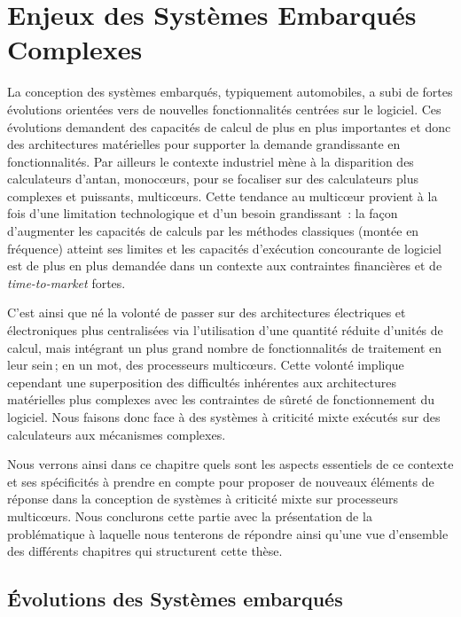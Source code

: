 \documentclass[french, a4paper, 11pt, twoside, pdftex]{StyleThese}
\begin{document}
\setcounter{chapter}{1}
\dominitoc
\faketableofcontents
\fi

\chapter{Enjeux des Systèmes Embarqués Complexes} \label{chap:1_EnjeuxIntro}
\minitoc

La conception des systèmes embarqués, typiquement automobiles, a subi de fortes évolutions orientées vers de nouvelles fonctionnalités centrées sur le logiciel.
Ces évolutions demandent des capacités de calcul de plus en plus importantes et donc des architectures matérielles pour supporter la demande grandissante en fonctionnalités.
Par ailleurs le contexte industriel mène à la disparition des calculateurs d'antan, monocœurs, pour se focaliser sur des calculateurs plus complexes et puissants, multicœurs.
Cette tendance au multicœur provient à la fois d'une limitation technologique et d'un besoin grandissant~: la façon d'augmenter les capacités de calculs par les méthodes classiques (montée en fréquence) atteint ses limites et les capacités d'exécution concourante de logiciel est de plus en plus demandée dans un contexte aux contraintes financières et de \textit{time-to-market} fortes.

C'est ainsi que né la volonté de passer sur des architectures électriques et électroniques plus centralisées via l'utilisation d'une quantité réduite d'unités de calcul, mais intégrant un plus grand nombre de fonctionnalités de traitement en leur sein ; en un mot, des processeurs multicœurs. Cette volonté implique cependant une superposition des difficultés inhérentes aux architectures matérielles plus complexes avec les contraintes de sûreté de fonctionnement du logiciel. Nous faisons donc face à des systèmes à criticité mixte exécutés sur des calculateurs aux mécanismes complexes.

Nous verrons ainsi dans ce chapitre quels sont les aspects essentiels de ce contexte et ses spécificités à prendre en compte pour proposer de nouveaux éléments de réponse dans la conception de systèmes à criticité mixte sur processeurs multicœurs. Nous conclurons cette partie avec la présentation de la problématique à laquelle nous tenterons de répondre ainsi qu'une vue d'ensemble des différents chapitres qui structurent cette thèse.

\section{Évolutions des Systèmes embarqués}
\end{document}

